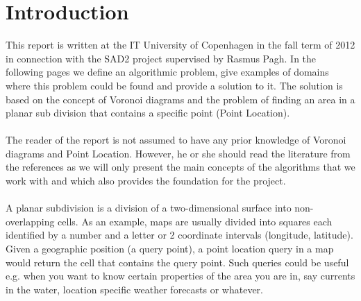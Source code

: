 


\setcounter{page}{1}
\section{Introduction}
This report is written at the IT University of Copenhagen in the fall term of 2012 in connection with the SAD2 project supervised by Rasmus Pagh. In the following pages we define an algorithmic problem, give examples of domains where this problem could be found and provide a solution to it. The solution is based on the concept of Voronoi diagrams and the problem of finding an area in a planar sub division that contains a specific point (Point Location).

\paragraph{}
The reader of the report is not assumed to have any prior knowledge of Voronoi diagrams and Point Location. However, he or she should read the literature from the references as we will only present the main concepts of the algorithms that we work with and which also provides the foundation for the project.

\paragraph{}
A planar subdivision is a division of a two-dimensional surface into non-overlapping cells. As an example, maps are usually divided into squares each identified by a number and a letter or 2 coordinate intervals (longitude, latitude). Given a geographic position (a query point), a point location query in a map would return the cell that contains the query point. Such queries could be useful e.g. when you want to know certain properties of the area you are in, say currents in the water, location specific weather forecasts or whatever. 

